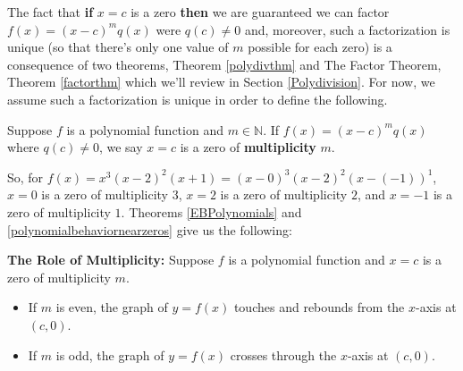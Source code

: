 \documentclass{ximera}
\begin{document}

The fact that \textbf{if} $x=c$ is a zero \textbf{then} we are guaranteed we can factor $f(x) = (x-c)^m q(x)$ were $q(c) \neq 0$ and, moreover, such a factorization is unique (so that there's only one value of $m$ possible for each zero) is a consequence of two theorems, Theorem \ref{polydivthm} and The Factor Theorem, Theorem \ref{factorthm} which we'll review in Section \ref{Polydivision}.  For now, we assume such a factorization is unique in order to define the following.



\begin{definition} \label{multiplicity} Suppose $f$ is a polynomial function and $m \in \mathbb{N}$. If $f(x) = (x-c)^m q(x)$ where $q(c) \neq 0$, we say  $x=c$ is a zero of \textbf{multiplicity} $m$.

\end{definition}



So, for $f(x) =  x^3 (x-2)^2 (x+1) = (x-0)^3(x-2)^2(x-(-1))^1$, $x=0$ is a zero of multiplicity $3$, $x=2$ is a zero of multiplicity $2$, and $x =-1$ is a zero of multiplicity $1$.  Theorems   \ref{EBPolynomials}  and \ref{polynomialbehaviornearzeros} give us the following:



\begin{theorem} \label{roleofmultiplicity} \textbf{The Role of Multiplicity:}  Suppose $f$ is a polynomial function  and $x=c$ is a zero of multiplicity $m$.  

\begin{itemize}

\item  If $m$ is even, the graph of $y=f(x)$ touches and rebounds from the $x$-axis at $(c,0)$.

\item  If $m$ is odd, the graph of $y=f(x)$ crosses through the $x$-axis at $(c,0)$.

\end{itemize}

\end{theorem}
\end{document}
